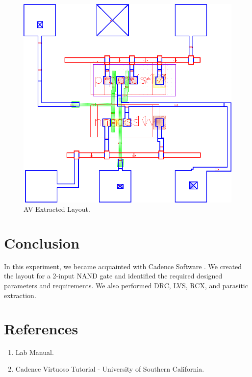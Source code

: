 \documentclass[11pt]{article}
\begin{document}
\begin{figure}[!h]
    \includegraphics[width=\textwidth]{avExtracted}
    \caption{AV Extracted Layout.}
\end{figure}
\newpage
\section{Conclusion}
In this experiment, we became acquainted with Cadence Software . We
created the layout for a 2-input NAND gate and identified the required designed
parameters and requirements. We also performed DRC, LVS, RCX, and parasitic extraction.
\section{References}
\begin{enumerate}
    \item Lab Manual.
    \item Cadence Virtuoso Tutorial - University of Southern California.
\end{enumerate}
\end{document}

